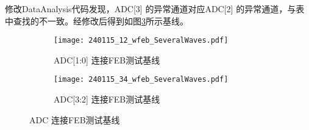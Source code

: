 修改DataAnalysis代码发现，ADC[3] 的异常通道对应ADC[2] 的异常通道，与表中查找的不一致。经修改后得到如图\ref{fig:ADC_wfeb}所示基线。\par
\begin{figure}[htbp]
  \centering
  \begin{subfigure}[b]{0.45\textwidth}
    \texttt{[image: 240115\_12\_wfeb\_SeveralWaves.pdf]}
    \caption{ADC[1:0] 连接FEB测试基线}
    \label{fig:adc12_wfeb}
  \end{subfigure}
  \hfill
  \begin{subfigure}[b]{0.45\textwidth}
    \texttt{[image: 240115\_34\_wfeb\_SeveralWaves.pdf]}
    \caption{ADC[3:2] 连接FEB测试基线}
    \label{fig:adc34_wfeb}
  \end{subfigure}
  \caption{ADC 连接FEB测试基线}
  \label{fig:ADC_wfeb}
\end{figure}
